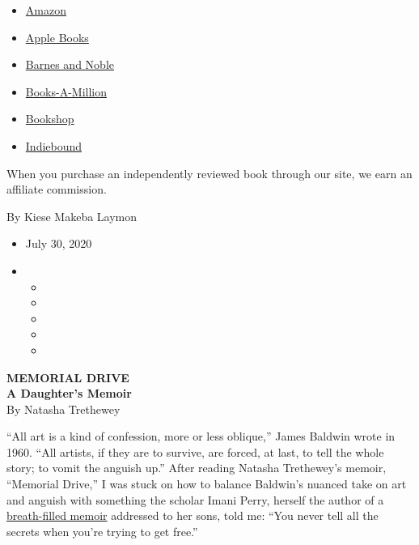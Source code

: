 \begin{itemize}
\tightlist
\item
  \href{https://www.amazon.com/gp/search?index=books\&tag=NYTBSREV-20\&field-keywords=Memorial+Drive\%3A+A+Daughter\%27s+Memoir+Natastha+Trethewey}{Amazon}
\item
  \href{https://du-gae-books-dot-nyt-du-prd.appspot.com/buy?title=Memorial+Drive\%3A+A+Daughter\%27s+Memoir\&author=Natastha+Trethewey}{Apple
  Books}
\item
  \href{https://www.anrdoezrs.net/click-7990613-11819508?url=https\%3A\%2F\%2Fwww.barnesandnoble.com\%2Fs\%2FMemorial+Drive\%3A+A+Daughter\%27s+Memoir+Natastha+Trethewey}{Barnes
  and Noble}
\item
  \href{https://www.anrdoezrs.net/click-7990613-35140?url=https\%3A\%2F\%2Fwww.booksamillion.com\%2Fsearch\%3Fquery\%3DMemorial\%2BDrive\%253A\%2BA\%2BDaughter\%2527s\%2BMemoir\%2BNatastha\%2BTrethewey}{Books-A-Million}
\item
  \href{https://bookshop.org/books?keywords=Memorial+Drive\%3A+A+Daughter\%27s+Memoir}{Bookshop}
\item
  \href{https://www.indiebound.org/search/book?searchfor=Memorial+Drive\%3A+A+Daughter\%27s+Memoir+Natastha+Trethewey\&aff=NYT}{Indiebound}
\end{itemize}

When you purchase an independently reviewed book through our site, we
earn an affiliate commission.

By Kiese Makeba Laymon

\begin{itemize}
\item
  July 30, 2020
\item
  \begin{itemize}
  \item
  \item
  \item
  \item
  \item
  \end{itemize}
\end{itemize}

\textbf{MEMORIAL DRIVE}\\
\textbf{A Daughter's Memoir}\\
By Natasha Trethewey

``All art is a kind of confession, more or less oblique,'' James Baldwin
wrote in 1960. ``All artists, if they are to survive, are forced, at
last, to tell the whole story; to vomit the anguish up.'' After reading
Natasha Trethewey's memoir, ``Memorial Drive,'' I was stuck on how to
balance Baldwin's nuanced take on art and anguish with something the
scholar Imani Perry, herself the author of a
\href{https://www.nytimes.com/2019/09/28/books/review/breathe-imani-perry.html?searchResultPosition=3}{breath-filled
memoir} addressed to her sons, told me: ``You never tell all the secrets
when you're trying to get free.''

